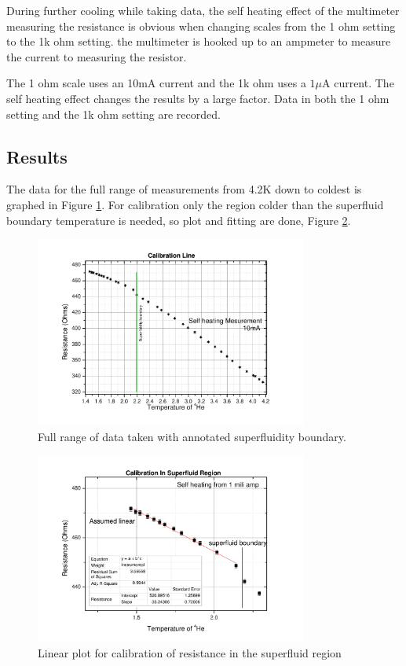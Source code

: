 During further cooling while taking data,
the self heating effect of the multimeter
measuring the resistance is obvious when changing scales 
from the 1 ohm setting to the 1k ohm setting.
the multimeter is hooked up to an ampmeter to
measure the current to measuring the resistor.

The 1 ohm scale uses an 10mA current and the 1k ohm uses a $1\mu$A current.
The self heating effect changes the results by a large factor.
Data in both the 1 ohm setting and the 1k ohm setting are recorded.


\subsection{Results}

The data for the full range of measurements from 4.2K down to coldest is graphed
in Figure \ref{fig:selfheatingcali}. For calibration only the region colder than
the superfluid boundary temperature is needed, so plot and fitting are done,
Figure \ref{fig:calibrationline}.

\begin{figure}[htbp]
\centering
\includegraphics[width = 0.8\textwidth]{pics/selfheatingcali.pdf}
\caption{Full range of data taken with annotated superfluidity boundary.\label{fig:selfheatingcali}}
\end{figure}

\begin{figure}[htbp]
\centering
\includegraphics[width = 0.8\textwidth]{pics/calibrationline2.pdf}
\caption{Linear plot for calibration of resistance in the superfluid region\label{fig:calibrationline}}
\end{figure}

